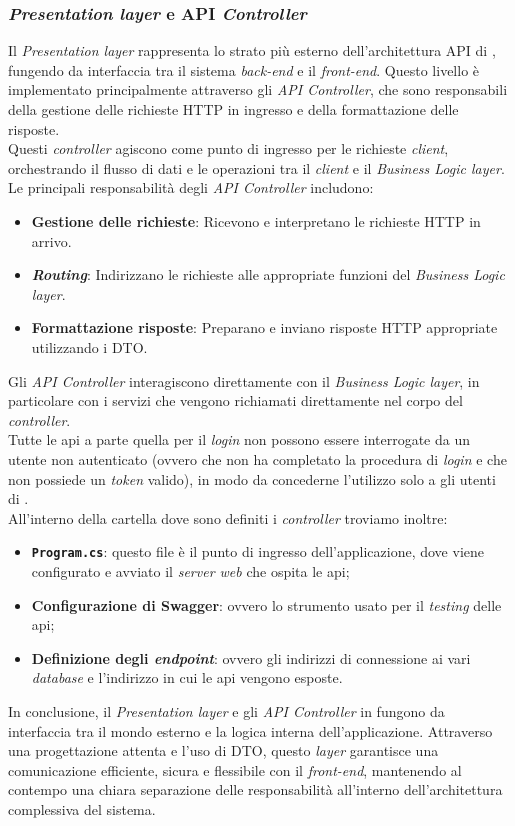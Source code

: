 \subsubsection{\textit{Presentation layer} e API \textit{Controller}}
Il \textit{Presentation layer} rappresenta lo strato più esterno dell'architettura API di {\movi}, fungendo da interfaccia 
tra il sistema \textit{back-end} e il \textit{front-end}. Questo livello è implementato principalmente attraverso gli 
\textit{API Controller}, che sono responsabili della gestione delle richieste HTTP in ingresso e della formattazione 
delle risposte.\\
Questi \textit{controller} agiscono come punto di ingresso per le richieste \textit{client}, orchestrando il flusso 
di dati e le operazioni tra il \textit{client} e il \textit{Business Logic layer}.\\
Le principali responsabilità degli \textit{API Controller} includono:
\begin{itemize}
    \item \textbf{Gestione delle richieste}: Ricevono e interpretano le richieste HTTP in arrivo.
    \item \textbf{\textit{Routing}}: Indirizzano le richieste alle appropriate funzioni del \textit{Business Logic layer}.
    \item \textbf{Formattazione risposte}: Preparano e inviano risposte HTTP appropriate utilizzando i DTO.
\end{itemize}
Gli \textit{API Controller} interagiscono direttamente con il \textit{Business Logic layer}, in particolare con i 
servizi che vengono richiamati direttamente nel corpo del \textit{controller}.\\
Tutte le \gls{api} a parte quella per il \textit{login} non possono essere interrogate da un utente non autenticato 
(ovvero che non ha completato la procedura di \textit{login} e che non possiede un \textit{token} valido), in modo 
da concederne l'utilizzo solo a gli utenti di {\movi}.\\
All'interno della cartella dove sono definiti i \textit{controller} troviamo inoltre:
\begin{itemize}
    \item \textbf{\texttt{Program.cs}}: questo file è il punto di ingresso dell'applicazione, dove viene configurato e avviato il 
           \textit{server web} che ospita le \gls{api};
    \item \textbf{Configurazione di Swagger}: ovvero lo strumento usato per il \textit{testing} delle \gls{api};
    \item \textbf{Definizione degli \textit{endpoint}}: ovvero gli indirizzi di connessione ai vari \textit{database} 
          e l'indirizzo in cui le \gls{api} vengono esposte.
\end{itemize}
In conclusione, il \textit{Presentation layer} e gli \textit{API Controller} in {\movi} fungono da interfaccia 
tra il mondo esterno e la logica interna dell'applicazione. Attraverso una progettazione attenta e l'uso di DTO, questo 
\textit{layer} garantisce una comunicazione efficiente, sicura e flessibile con il \textit{front-end}, mantenendo al 
contempo una chiara separazione delle responsabilità all'interno dell'architettura complessiva del sistema.